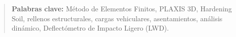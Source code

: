\begin{quotation}
 
 
 
\noindent \textbf{Palabras clave:} Método de Elementos Finitos, PLAXIS 3D, Hardening Soil, rellenos estructurales, cargas vehiculares, asentamientos, análisis dinámico, Deflectómetro de Impacto Ligero (LWD).
\end{quotation}

\vfill


